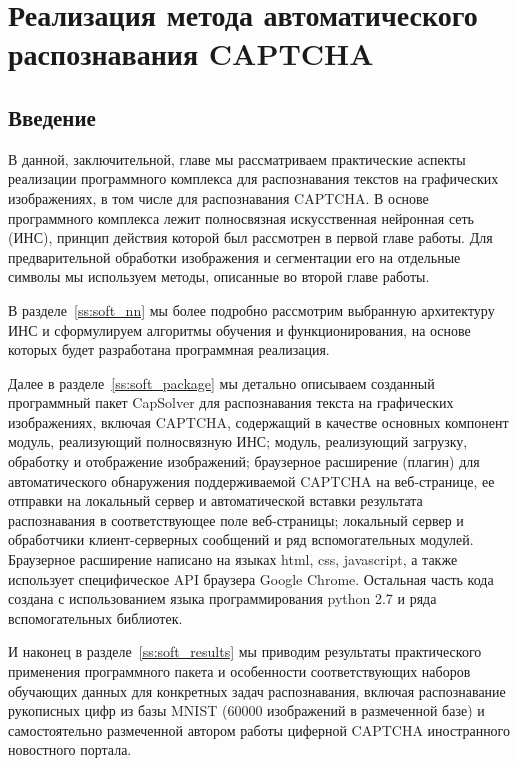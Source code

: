 \documentclass[a4paper,12pt,russian]{article} %
\begin{document}
\newpage
\section{Реализация метода автоматического распознавания CAPTCHA} \label{s:soft}

\subsection{Введение} \label{ss:soft_intro}

В данной, заключительной, главе мы рассматриваем практические аспекты реализации программного комплекса для распознавания текстов на графических изображениях, в том числе для распознавания CAPTCHA.
В основе программного комплекса лежит полносвязная искусственная нейронная сеть (ИНС), принцип действия которой был рассмотрен в первой главе работы.
Для предварительной обработки изображения и сегментации его на отдельные символы мы используем методы, описанные во второй главе работы.

В разделе~\ref{ss:soft_nn} мы более подробно рассмотрим выбранную архитектуру ИНС и сформулируем алгоритмы обучения и функционирования, на основе которых будет разработана программная реализация.

Далее в разделе~\ref{ss:soft_package} мы детально описываем созданный программный пакет CapSolver для распознавания текста на графических изображениях, включая CAPTCHA, содержащий в качестве основных компонент модуль, реализующий полносвязную ИНС; модуль, реализующий загрузку, обработку и отображение изображений; браузерное расширение (плагин) для автоматического обнаружения поддерживаемой CAPTCHA на веб-странице, ее отправки на локальный сервер и автоматической вставки результата распознавания в соответствующее поле веб-страницы; локальный сервер и обработчики клиент-серверных сообщений и ряд вспомогательных модулей.
Браузерное расширение написано на языках html, css, javascript, а также использует специфическое API браузера Google Chrome.
Остальная часть кода создана с использованием языка программирования python 2.7 и ряда вспомогательных библиотек.

И наконец в разделе~\ref{ss:soft_results} мы приводим результаты практического применения программного пакета и особенности соответствующих наборов обучающих данных для конкретных задач распознавания, включая распознавание рукописных цифр из базы MNIST ($60000$ изображений в размеченной базе) и самостоятельно размеченной автором работы циферной CAPTCHA иностранного новостного портала.
\end{document}
